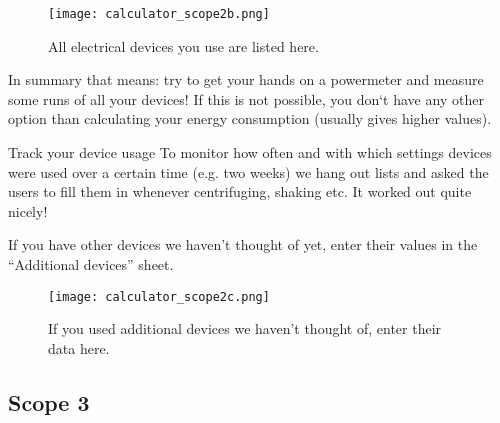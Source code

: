 \begin{figure}[h!]
	\centering
	\texttt{[image: calculator\_scope2b.png]}%
	\caption{All electrical devices you use are listed here.}%
\end{figure}

In summary that means: try to get your hands on a powermeter and measure some runs of all your devices! If this is not possible, you don`t have any other option than calculating your energy consumption (usually gives higher values). 

\begin{suggest}{Track your device usage}
	To monitor how often and with which settings devices were used over a certain time (e.g. two weeks) we hang out lists and asked the users to fill them in whenever centrifuging, shaking etc. It worked out quite nicely!
\end{suggest}

If you have other devices we haven’t thought of yet, enter their values in the “Additional devices” sheet.
	
\begin{figure}[h!]
	\centering
	\texttt{[image: calculator\_scope2c.png]}%
	\caption{If you used additional devices we haven't thought of, enter their data here.}%
\end{figure}

\clearpage
\subsection{Scope 3}

